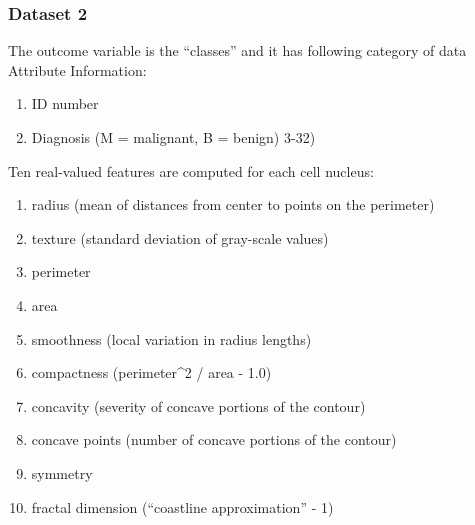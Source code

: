 \documentclass[]{article}
\providecommand{\tightlist}{%
  \setlength{\itemsep}{0pt}\setlength{\parskip}{0pt}}
\begin{document}
\subsubsection{Dataset 2}\label{dataset-2}

The outcome variable is the ``classes'' and it has following category of
data Attribute Information:

\begin{enumerate}
\def\labelenumi{\arabic{enumi})}
\tightlist
\item
  ID number
\item
  Diagnosis (M = malignant, B = benign) 3-32)
\end{enumerate}

Ten real-valued features are computed for each cell nucleus:

\begin{enumerate}
\def\labelenumi{\alph{enumi})}
\tightlist
\item
  radius (mean of distances from center to points on the perimeter)
\item
  texture (standard deviation of gray-scale values)
\item
  perimeter
\item
  area
\item
  smoothness (local variation in radius lengths)
\item
  compactness (perimeter\^{}2 / area - 1.0)
\item
  concavity (severity of concave portions of the contour)
\item
  concave points (number of concave portions of the contour)
\item
  symmetry
\item
  fractal dimension (``coastline approximation'' - 1)
\end{enumerate}
\end{document}
